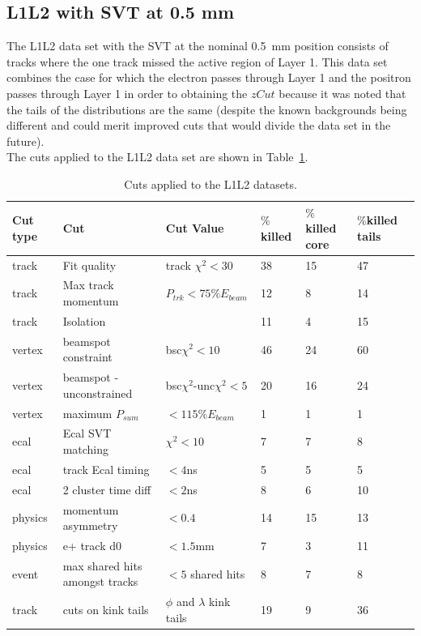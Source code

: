 \subsection{L1L2 with SVT at 0.5 mm}

The L1L2 data set with the SVT at the nominal 0.5~mm position consists of tracks where the one track missed the active region of Layer 1. This data set combines the case for which the electron passes through Layer 1 and the positron passes through Layer 1 in order to obtaining the $zCut$ because it was noted that the tails of the distributions are the same (despite the known backgrounds being different and could merit improved cuts that would divide the data set in the future). \\
\indent The cuts applied to the L1L2 data set are shown in Table~\ref{l1l2_cuts}. 

\begin{table}[H]
\caption{Cuts applied to the L1L2 datasets.}
\label{l1l2_cuts}
\centering
\begin{tabular}{lllllll}
\toprule
Cut type & Cut & Cut Value &  $\%$killed &  $\%$killed core & $\%$killed tails\\
\midrule
track & Fit quality & track $\chi^{2}<30$ & 38 & 15 & 47 \\
track & Max track momentum &  $P_{trk}<75\%E_{beam}$ & 12 & 8 & 14 \\
track & Isolation &   & 11 & 4 & 15 \\
vertex & beamspot constraint & bsc$\chi^{2}<10$  & 46 & 24 & 60 \\
vertex & beamspot - unconstrained & bsc$\chi^{2}$-unc$\chi^2<5$  & 20 & 16 & 24 \\
vertex & maximum $P_{sum}$ &  $<115\%E_{beam}$ & 1 & 1 & 1 \\
ecal & Ecal SVT matching & $\chi^2<10$  & 7 & 7 & 8 \\
ecal & track Ecal timing & $<4$ns  & 5 & 5 & 5 \\
ecal & 2 cluster time diff & $<2$ns  & 8 & 6 & 10 \\
physics & momentum asymmetry & $<0.4$  & 14 & 15 & 13 \\
physics & e+ track d0 & $<1.5$mm  & 7 & 3 & 11 \\
event & max shared hits amongst tracks & $<5$ shared hits  & 8 & 7 & 8 \\
track & cuts on kink tails & $\phi$ and $\lambda$ kink tails & 19 & 9 & 36 \\
\bottomrule
\end{tabular}
\end{table}

